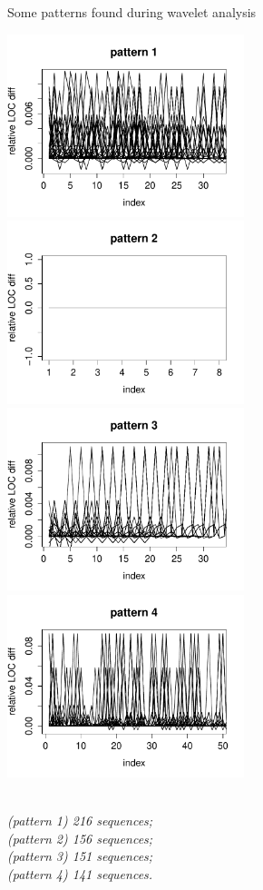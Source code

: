 \begin{figure}[H]
\caption{Some patterns found during wavelet
analysis}\label{figure:patterns_plots}
\caption*{\\[1em]\footnotesize\textit{(pattern 1) 216 sequences;\\ (pattern 2)
156 sequences;\\ (pattern 3) 151 sequences;\\ (pattern 4) 141 sequences.}\\[1em]}
\centering
	\includegraphics[width=196pt]{images/pattern_1.pdf}
	\hspace{1em}
	\includegraphics[width=196pt]{images/pattern_2.pdf}
	\\
	\vspace{1em}
	\includegraphics[width=196pt]{images/pattern_3.pdf}
	\hspace{1em}
	\includegraphics[width=196pt]{images/pattern_4.pdf}
\end{figure}
